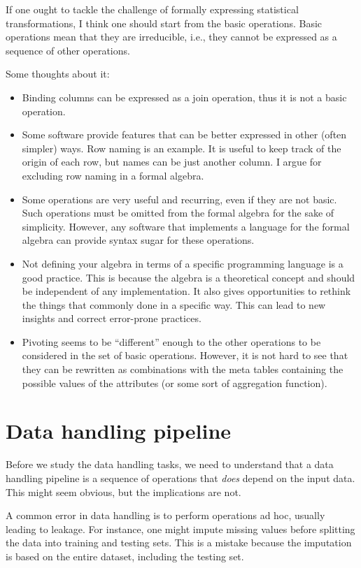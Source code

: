 If one ought to tackle the challenge of formally expressing statistical transformations, I
think one should start from the basic operations.  Basic operations mean that they are
irreducible, i.e., they cannot be expressed as a sequence of other operations.

Some thoughts about it:
\begin{itemize}
  \item Binding columns can be expressed as a join operation, thus it is not a basic
    operation.
  \item Some software provide features that can be better expressed in other (often simpler) ways.  Row
    naming is an example.  It is useful to keep track of the origin of each row, but names
    can be just another column.  I argue for excluding row naming in a formal algebra.
  \item Some operations are very useful and recurring, even if they are not basic.  Such
    operations must be omitted from the formal algebra for the sake of simplicity.
    However, any software that implements a language for the formal algebra can provide
    syntax sugar for these operations.
  \item Not defining your algebra in terms of a specific programming language is a good
    practice.  This is because the algebra is a theoretical concept and should be
    independent of any implementation.  It also gives opportunities to rethink the
    things that commonly done in a specific way.  This can lead to new insights and
    correct error-prone practices.
  \item Pivoting seems to be ``different'' enough to the other operations to be considered
    in the set of basic operations.  However, it is not hard to see that they can be
    rewritten as combinations with the meta tables containing the possible values of the
    attributes (or some sort of aggregation function).
\end{itemize}

\section{Data handling pipeline}

Before we study the data handling tasks, we need to understand that a data handling
pipeline is a sequence of operations that \emph{does} depend on the input data.
This might seem obvious, but the implications are not.

A common error in data handling is to perform operations ad hoc, usually leading to
\gls{leakage}.  For instance, one might impute missing values before splitting the data into
training and testing sets.  This is a mistake because the imputation is based on the
entire dataset, including the testing set.

